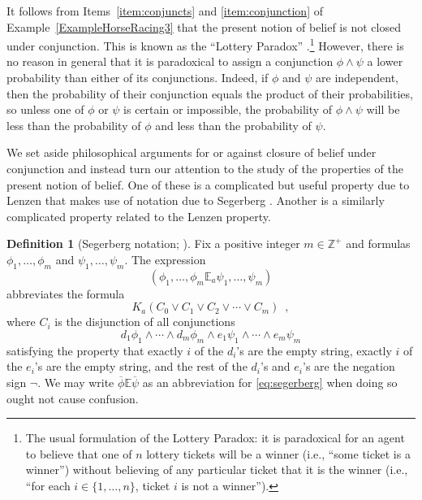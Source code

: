 \documentclass[12pt]{article}
\theoremstyle{definition}
\newtheorem{definition}[theorem]{Definition}
\newcommand{\Int}{\mathbb{Z}}  %
\begin{document}
It follows from Items~\ref{item:conjuncts} and \ref{item:conjunction}
of Example~\ref{ExampleHorseRacing3} that the present notion of belief
is not closed under conjunction.  This is known as the ``Lottery
Paradox'' \cite{Kyburg1961:patlorb}.\footnote{The usual formulation of
  the Lottery Paradox: it is paradoxical for an agent to believe that
  one of $n$ lottery tickets will be a winner (i.e., ``some ticket is
  a winner'') without believing of any particular ticket that it is
  the winner (i.e., ``for each $i\in\{1,\dots,n\}$, ticket $i$ is not
  a winner'').}  However, there is no reason in general that it is
paradoxical to assign a conjunction $\phi \land \psi$ a lower
probability than either of its conjunctions.  Indeed, if $\phi$ and
$\psi$ are independent, then the probability of their conjunction
equals the product of their probabilities, so unless one of $\phi$ or
$\psi$ is certain or impossible, the probability of $\phi \land \psi$
will be less than the probability of $\phi$ and less than the
probability of $\psi$.

We set aside philosophical arguments for or against closure of belief
under conjunction and instead turn our attention to the study of the
properties of the present notion of belief.  One of these is a
complicated but useful property due to Lenzen \cite{Lenzen2003:kbasp}
that makes use of notation due to Segerberg
\cite{Segerberg1971:qpiams}.  Another is a similarly complicated
property related to the Lenzen property.

\begin{definition}[Segerberg notation; \cite{Segerberg1971:qpiams}]
  \label{definition:segerberg-notation}
  Fix a positive integer $m\in\Int^+$ and formulas
  $\phi_1,\dots,\phi_m$ and $\psi_1,\dots,\psi_m$.  The expression
  \begin{equation}
    (\phi_1,\dots,\phi_m\mathbb{E}_a\psi_1,\dots,\psi_m)
    \label{eq:segerberg}
  \end{equation}
  abbreviates the formula
  \[
  K_a(C_0\lor C_1\lor C_2 \lor \cdots \lor C_m)\enspace,
  \]
  where $C_i$ is the disjunction of all conjunctions
  \[
  d_1\phi_1\land\cdots\land d_m\phi_m \land
  e_1\psi_1\land\cdots\land e_m\psi_m
  \]
  satisfying the property that exactly $i$ of the $d_i$'s are the
  empty string, exactly $i$ of the $e_i$'s are the empty string, and
  the rest of the $d_i$'s and $e_i$'s are the negation sign $\lnot$.
  We may write $\overline\phi\mathbb{E}\overline\psi$ as an
  abbreviation for \eqref{eq:segerberg} when doing so ought not cause
  confusion.
\end{definition}
\end{document}
